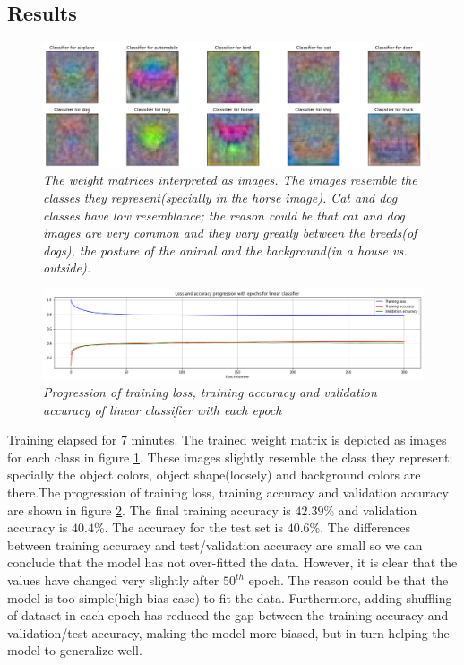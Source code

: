 \documentclass[10pt, a4paper, twocolumn]{article}
\begin{document}
\subsection{Results}
\begin{figure}
  \centering
	\includegraphics[width=.9\textwidth]{./images/linearClasses.png}
	\caption{\textit{The weight matrices interpreted as images. The images resemble the classes they represent(specially in the horse image). Cat and dog classes have low resemblance; the reason could be that cat and dog images are very common and they vary greatly between the breeds(of dogs), the posture of the animal and the background(in a house vs. outside).}}
	\label{fig:linClas}
\end{figure}
\begin{figure}
	\includegraphics[width=.49\textwidth]{./images/linearLoss.png}
	\caption{\textit{Progression of training loss, training accuracy and validation accuracy of linear classifier with each epoch}}
	\label{fig:linLoss}	
\end{figure}
Training elapsed for 7 minutes. The trained weight matrix is depicted as images for each class in figure \ref{fig:linClas}. These images slightly resemble the class they represent; specially the object colors, object shape(loosely) and background colors are there.The progression of training loss, training accuracy and validation accuracy are shown in figure \ref{fig:linLoss}. The final training accuracy is $42.39\%$ and validation accuracy is $40.4\%$. The accuracy for the test set is $40.6\%$. The differences between training accuracy and test/validation accuracy are small so we can conclude that the model has not over-fitted the data. However, it is clear that the values have changed very slightly after $50^{th}$ epoch. The reason could be that the model is too simple(high bias case) to fit the data. Furthermore, adding shuffling of dataset in each epoch has reduced the gap between the training accuracy and validation/test accuracy, making the model more biased, but in-turn helping the model to generalize well.
\end{document}
